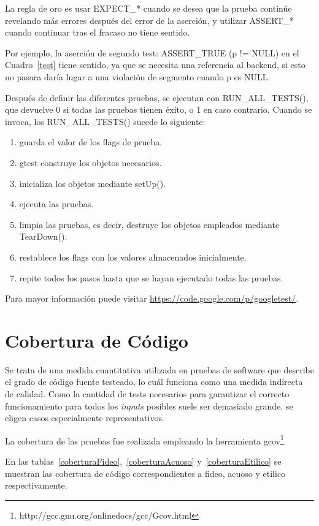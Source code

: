 \par La regla de oro es usar EXPECT\_* cuando se desea que la prueba continúe revelando más errores después del error de la aserción, y utilizar ASSERT\_* cuando continuar tras el fracaso no tiene sentido.

\par Por ejemplo, la aserción de segundo test: ASSERT\_TRUE (p != NULL) en el Cuadro~\ref{test} tiene sentido, ya que se necesita una referencia al backend, si esto no pasara daría lugar a una violación de segmento cuando p es NULL.

\par Después de definir las diferentes pruebas, se ejecutan con RUN\_ALL\_TESTS(), que devuelve 0 si todas las pruebas tienen éxito, o 1 en caso contrario. Cuando se invoca, los RUN\_ALL\_TESTS() sucede lo siguiente:

\begin{enumerate}
	\item guarda el valor de los flags de prueba.
	\item gtest construye los objetos necesarios.
	\item inicializa los objetos mediante setUp().
	\item ejecuta las pruebas.
	\item limpia las pruebas, es decir, destruye los objetos empleados mediante TearDown().
	\item restablece los flags con los valores almacenados inicialmente.
	\item repite todos los pasos hasta que se hayan ejecutado todas las pruebas.
\end{enumerate}

Para mayor información puede visitar \url{https://code.google.com/p/googletest/}.

\section{Cobertura de Código}
\par Se trata de una medida cuantitativa utilizada en pruebas de software que describe el grado de código fuente testeado, lo cuál funciona como una medida indirecta de calidad. Como la cantidad de tests necesarios para garantizar el correcto funcionamiento para todos los \textit{inputs} posibles suele ser demasiado grande, se eligen casos especialmente representativos. 
\par La cobertura de las pruebas fue realizada empleando la herramienta gcov\footnote{http://gcc.gnu.org/onlinedocs/gcc/Gcov.html}. 
\par En las tablas~\ref{coberturaFideo},~\ref{coberturaAcuoso} y~\ref{coberturaEtilico} se muestran las cobertura de código correspondientes a fideo, acuoso y etilico respectivamente.

